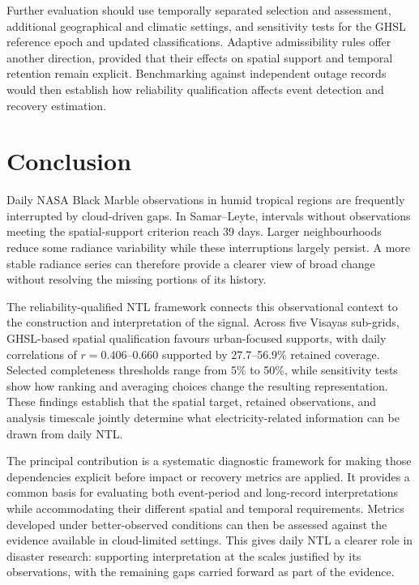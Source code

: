 \documentclass[]{interact}
\theoremstyle{plain}%
\theoremstyle{definition}
\theoremstyle{remark}
\begin{document}
        Further evaluation should use temporally separated selection and assessment, additional geographical and climatic settings, and sensitivity tests for the GHSL reference epoch and updated classifications. Adaptive admissibility rules offer another direction, provided that their effects on spatial support and temporal retention remain explicit. Benchmarking against independent outage records would then establish how reliability qualification affects event detection and recovery estimation.
                                
\section{Conclusion}

    
    Daily NASA Black Marble observations in humid tropical regions are frequently interrupted by cloud-driven gaps. In Samar--Leyte, intervals without observations meeting the spatial-support criterion reach 39 days. Larger neighbourhoods reduce some radiance variability while these interruptions largely persist. A more stable radiance series can therefore provide a clearer view of broad change without resolving the missing portions of its history.
    
    The reliability-qualified NTL framework connects this observational context to the construction and interpretation of the signal. Across five Visayas sub-grids, GHSL-based spatial qualification favours urban-focused supports, with daily correlations of $r=0.406$--$0.660$ supported by 27.7--56.9\% retained coverage. Selected completeness thresholds range from 5\% to 50\%, while sensitivity tests show how ranking and averaging choices change the resulting representation. These findings establish that the spatial target, retained observations, and analysis timescale jointly determine what electricity-related information can be drawn from daily NTL.
    
    The principal contribution is a systematic diagnostic framework for making those dependencies explicit before impact or recovery metrics are applied. It provides a common basis for evaluating both event-period and long-record interpretations while accommodating their different spatial and temporal requirements. Metrics developed under better-observed conditions can then be assessed against the evidence available in cloud-limited settings. This gives daily NTL a clearer role in disaster research: supporting interpretation at the scales justified by its observations, with the remaining gaps carried forward as part of the evidence.
\end{document}
